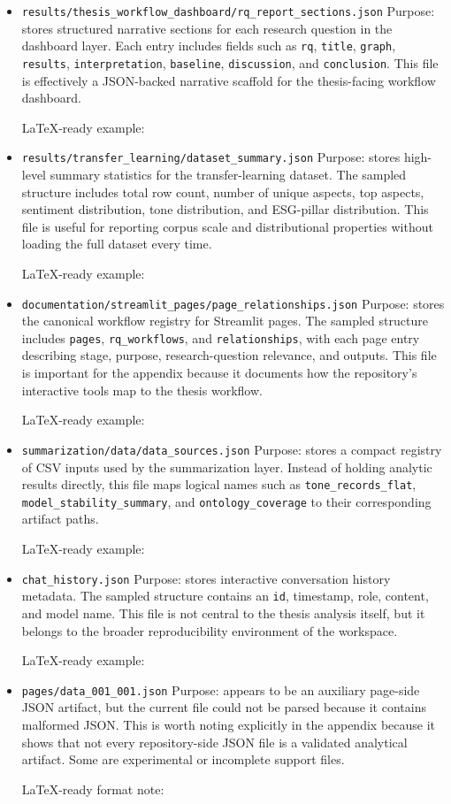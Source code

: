 \documentclass[12pt,a4paper]{report}
\begin{document}
\begin{itemize}
  LaTeX-ready example:
\item
  \texttt{results/thesis\_workflow\_dashboard/rq\_report\_sections.json} Purpose: stores structured narrative sections for each research question in the dashboard layer. Each entry includes fields such as \texttt{rq}, \texttt{title}, \texttt{graph}, \texttt{results}, \texttt{interpretation}, \texttt{baseline}, \texttt{discussion}, and \texttt{conclusion}. This file is effectively a JSON-backed narrative scaffold for the thesis-facing workflow dashboard.

  LaTeX-ready example:
\item
  \texttt{results/transfer\_learning/dataset\_summary.json} Purpose: stores high-level summary statistics for the transfer-learning dataset. The sampled structure includes total row count, number of unique aspects, top aspects, sentiment distribution, tone distribution, and ESG-pillar distribution. This file is useful for reporting corpus scale and distributional properties without loading the full dataset every time.

  LaTeX-ready example:
\item
  \texttt{documentation/streamlit\_pages/page\_relationships.json} Purpose: stores the canonical workflow registry for Streamlit pages. The sampled structure includes \texttt{pages}, \texttt{rq\_workflows}, and \texttt{relationships}, with each page entry describing stage, purpose, research-question relevance, and outputs. This file is important for the appendix because it documents how the repository's interactive tools map to the thesis workflow.

  LaTeX-ready example:
\item
  \texttt{summarization/data/data\_sources.json} Purpose: stores a compact registry of CSV inputs used by the summarization layer. Instead of holding analytic results directly, this file maps logical names such as \texttt{tone\_records\_flat}, \texttt{model\_stability\_summary}, and \texttt{ontology\_coverage} to their corresponding artifact paths.

  LaTeX-ready example:
\item
  \texttt{chat\_history.json} Purpose: stores interactive conversation history metadata. The sampled structure contains an \texttt{id}, timestamp, role, content, and model name. This file is not central to the thesis analysis itself, but it belongs to the broader reproducibility environment of the workspace.

  LaTeX-ready example:
\item
  \texttt{pages/data\_001\_001.json} Purpose: appears to be an auxiliary page-side JSON artifact, but the current file could not be parsed because it contains malformed JSON. This is worth noting explicitly in the appendix because it shows that not every repository-side JSON file is a validated analytical artifact. Some are experimental or incomplete support files.

  LaTeX-ready format note:
\end{itemize}
\end{document}
